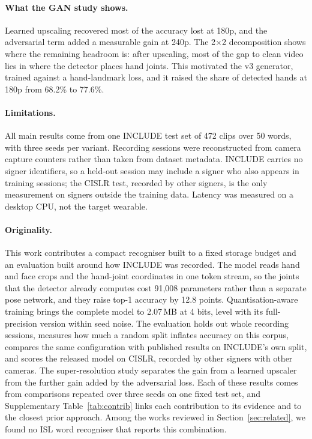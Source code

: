 \documentclass[pdflatex,sn-mathphys-num,twocolumn,lineno]{sn-jnl}
\theoremstyle{thmstyleone}%
\begin{document}
\paragraph{What the GAN study shows.} Learned upscaling recovered most of the accuracy lost at 180p, and the adversarial term added a measurable gain at 240p. The 2$\times$2 decomposition shows where the remaining headroom is: after upscaling, most of the gap to clean video lies in where the detector places hand joints. This motivated the v3 generator, trained against a hand-landmark loss, and it raised the share of detected hands at 180p from 68.2\% to 77.6\%.

\paragraph{Limitations.} All main results come from one INCLUDE test set of 472 clips over 50 words, with three seeds per variant. Recording sessions were reconstructed from camera capture counters rather than taken from dataset metadata. INCLUDE carries no signer identifiers, so a held-out session may include a signer who also appears in training sessions; the CISLR test, recorded by other signers, is the only measurement on signers outside the training data. Latency was measured on a desktop CPU, not the target wearable.

\paragraph{Originality.} This work contributes a compact recogniser built to a fixed storage budget and an evaluation built around how INCLUDE was recorded. The model reads hand and face crops and the hand-joint coordinates in one token stream, so the joints that the detector already computes cost 91,008 parameters rather than a separate pose network, and they raise top-1 accuracy by 12.8 points. Quantisation-aware training brings the complete model to 2.07\,MB at 4 bits, level with its full-precision version within seed noise. The evaluation holds out whole recording sessions, measures how much a random split inflates accuracy on this corpus, compares the same configuration with published results on INCLUDE's own split, and scores the released model on CISLR, recorded by other signers with other cameras. The super-resolution study separates the gain from a learned upscaler from the further gain added by the adversarial loss. Each of these results comes from comparisons repeated over three seeds on one fixed test set, and Supplementary Table~\ref{tab:contrib} links each contribution to its evidence and to the closest prior approach. Among the works reviewed in Section~\ref{sec:related}, we found no ISL word recogniser that reports this combination.
\end{document}

